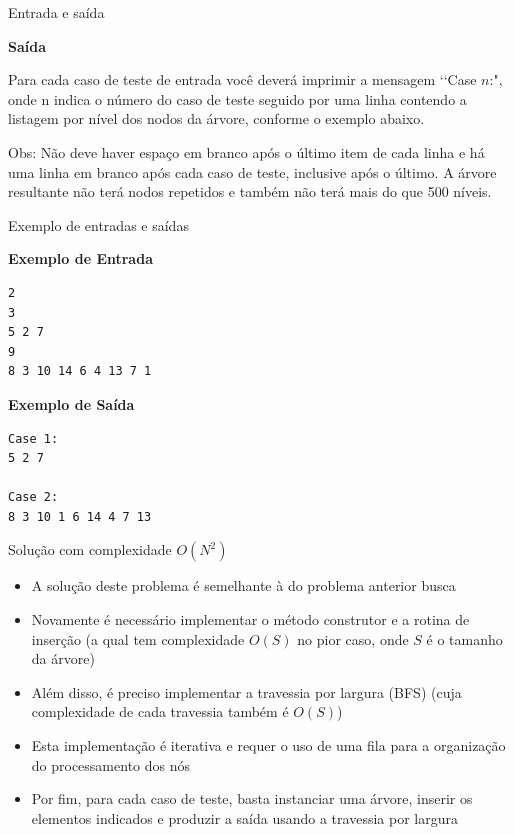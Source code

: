 \begin{frame}[fragile]{Entrada e saída}

\textbf{Saída}

Para cada caso de teste de entrada você deverá imprimir a mensagem \lq\lq Case $n$:", onde n indica o número do caso de teste seguido por uma linha contendo a listagem por nível dos nodos da árvore, conforme o exemplo abaixo. 

Obs: Não deve haver espaço em branco após o último item de cada linha e há uma linha em branco após cada caso de teste, inclusive após o último. A árvore resultante não terá nodos repetidos e também não terá mais do que 500 níveis.

\end{frame}


\begin{frame}[fragile]{Exemplo de entradas e saídas}

\begin{minipage}[t]{0.5\textwidth}
\textbf{Exemplo de Entrada}
\begin{verbatim}
2
3
5 2 7
9
8 3 10 14 6 4 13 7 1
\end{verbatim}
\end{minipage}
\begin{minipage}[t]{0.45\textwidth}
\textbf{Exemplo de Saída}
\begin{verbatim}
Case 1:
5 2 7

Case 2:
8 3 10 1 6 14 4 7 13
\end{verbatim}
\end{minipage}
\end{frame}

\begin{frame}[fragile]{Solução com complexidade $O(N^2)$}

    \begin{itemize}
        \item A solução deste problema é semelhante à do problema anterior
            busca

        \item Novamente é necessário implementar o método construtor e a rotina de inserção 
            (a qual tem
            complexidade $O(S)$ no pior caso, onde $S$ é o tamanho da árvore)

        \item Além disso, é preciso implementar a travessia por largura (BFS)
            (cuja complexidade de cada travessia também é $O(S)$)

        \item Esta implementação é iterativa e requer o uso de uma fila para a organização do
            processamento dos nós

        \item Por fim, para cada caso de teste, basta instanciar uma árvore, inserir os elementos
            indicados e produzir a saída usando a travessia por largura
   \end{itemize}

\end{frame}

